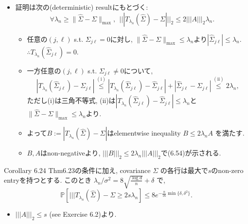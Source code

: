 \documentclass[unicode,aspectratio=169,11pt]{beamer}
\newcommand{\bb}{\mathbb}
\begin{document}
\begin{frame}{}{}
  \begin{itemize}
    \item 証明は次の(deterministic) resultにもとづく:
          \[\forall \lambda_n \ge \|\widehat{\Sigma} - \Sigma\|_{\max},\ \ |||T_{\lambda_n}(\widehat{\Sigma}) - \Sigma|||_2 \le 2|||A|||_2 \lambda_n. \tag{6.54}\]
          \begin{itemize}
            \item 任意の$(j,\ell)$ s.t. $\Sigma_{j\ell} = 0$に対し, $\|\widehat{\Sigma} - \Sigma\|_{\max} \le \lambda_n$より$|\widehat{\Sigma}_{j\ell}| \le \lambda_n$. $\therefore T_{\lambda_n}(\widehat{\Sigma}_{j\ell}) = 0$.
            \item 一方任意の$(j,\ell)$ s.t. $\Sigma_{j\ell} \ne 0$について,
                  \[
                    \left|T_{\lambda_{n}}\left(\widehat{\Sigma}_{j \ell}\right)-\Sigma_{j \ell}\right|
                    \stackrel{(\mathrm{i})}{\leq}\left|T_{\lambda_{n}}\left(\widehat{\Sigma}_{j \ell}\right)-\widehat{\Sigma}_{j \ell}\right|+\left|\widehat{\Sigma}_{j \ell}-\Sigma_{j \ell}\right|
                    \stackrel{(\mathrm{ii})}{\leq} 2 \lambda_{n},
                  \]
                  ただし(i)は三角不等式, (ii)は$\left|T_{\lambda_{n}}\left(\widehat{\Sigma}_{j \ell}\right)-\widehat{\Sigma}_{j \ell}\right| \le \lambda_n$と$\|\widehat{\Sigma}-\Sigma\|_{\max} \le \lambda_n$より.
            \item よって$B := |T_{\lambda_n}(\widehat{\Sigma}) - \Sigma|$はelementwise inequality $B \le 2 \lambda_n A$ を満たす.
            \item $B, A$はnon-negativeより, $|||B|||_2 \le 2 \lambda_n |||A|||_2$で(6.54)が示される.
          \end{itemize}
  \end{itemize}
\end{frame}

\begin{frame}{}{}
  \begin{block}{Corollary 6.24}
    Thm6.23の条件に加え, covariance $\Sigma$ の各行は最大で$s$のnon-zero entryを持つとする.
    このとき $\lambda_n/\sigma^2 = 8\sqrt{\frac{\log d}{n}} + \delta$ で,
    \[\bb{P}[|||T_{\lambda_n}(\widehat{\Sigma}) - \Sigma \ge 2 s \lambda_n] \le 8e^{-\frac{n}{16}\min\{\delta, \delta^2\}}. \tag{6.55}\]
  \end{block}
  \begin{itemize}
    \item $|||A|||_2 \le s$ (see Exercise 6.2)より.
  \end{itemize}
\end{frame}
\end{document}

